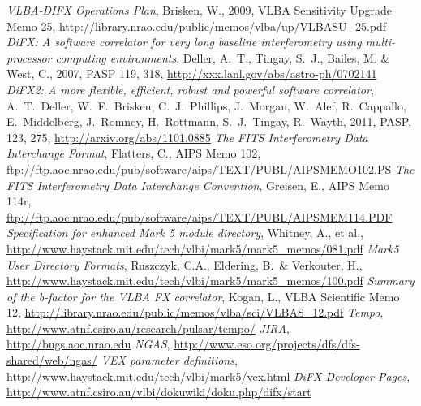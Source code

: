 \begin{thebibliography}{}
	{\it VLBA-DIFX Operations Plan}, Brisken, W., 2009, VLBA Sensitivity Upgrade Memo 25, \url{http://library.nrao.edu/public/memos/vlba/up/VLBASU_25.pdf}
	{\it DiFX: A software correlator for very long baseline interferometry using multi-processor computing environments}, Deller, A.~T., Tingay, S.~J., Bailes, M. \& West, C., 2007, PASP 119, 318, \url{http://xxx.lanl.gov/abs/astro-ph/0702141}
	{\it DiFX2: A more flexible, efficient, robust and powerful software correlator}, A.\ T.\ Deller, W.\ F.\ Brisken, C.\ J.\ Phillips, J.\ Morgan, W.\ Alef, R.\ Cappallo, E.\ Middelberg, J.\ Romney, H.\ Rottmann, S.\ J.\ Tingay, R.\ Wayth, 2011, PASP, 123, 275, \url{http://arxiv.org/abs/1101.0885}
	{\it The FITS Interferometry Data Interchange Format}, Flatters, C., AIPS Memo 102, \url{ftp://ftp.aoc.nrao.edu/pub/software/aips/TEXT/PUBL/AIPSMEMO102.PS}
	{\it The FITS Interferometry Data Interchange Convention}, Greisen, E., AIPS Memo 114r, \url{ftp://ftp.aoc.nrao.edu/pub/software/aips/TEXT/PUBL/AIPSMEM114.PDF}
	{\it Specification for enhanced Mark 5 module directory}, Whitney, A., et al., \url{http://www.haystack.mit.edu/tech/vlbi/mark5/mark5_memos/081.pdf}
	{\it  	Mark5 User Directory Formats}, Ruszczyk, C.A., Eldering, B.\ \& Verkouter, H., \url{http://www.haystack.mit.edu/tech/vlbi/mark5/mark5_memos/100.pdf}
	{\it Summary of the b-factor for the VLBA FX correlator}, Kogan, L., VLBA Scientific Memo 12, \url{http://library.nrao.edu/public/memos/vlba/sci/VLBAS_12.pdf}
	{\it Tempo}, \url{http://www.atnf.csiro.au/research/pulsar/tempo/}
	{\it JIRA}, \url{http://bugs.aoc.nrao.edu}
	{\it NGAS}, \url{http://www.eso.org/projects/dfs/dfs-shared/web/ngas/}
	{\it VEX parameter definitions}, \url{http://www.haystack.mit.edu/tech/vlbi/mark5/vex.html}
	{\it DiFX Developer Pages}, \url{http://www.atnf.csiro.au/vlbi/dokuwiki/doku.php/difx/start}
\end{thebibliography}
